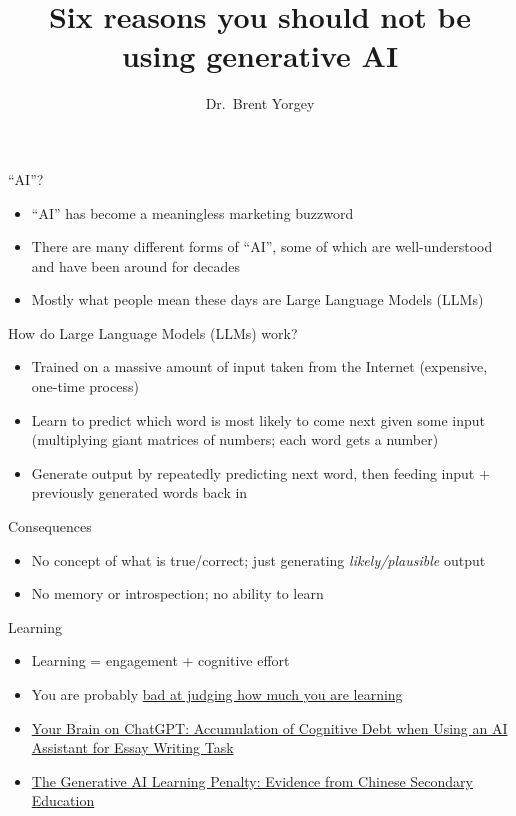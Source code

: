 \documentclass[hyperref={colorlinks},xcolor={usenames,dvipsnames,svgnames,table},12pt]{beamer}
\title{Six reasons you should not be using generative AI}
\date{}
\author{Dr.\ Brent Yorgey}
\begin{document}
\maketitle

\begin{frame}{``AI''?}
  \begin{itemize}
  \item ``AI'' has become a meaningless marketing buzzword
  \item There are many different forms of ``AI'', some of which are
    well-understood and have been around for decades
  \item Mostly what people mean these days are Large Language Models (LLMs)
  \end{itemize}
\end{frame}

\begin{frame}{How do Large Language Models (LLMs) work?}
  \begin{itemize}
  \item Trained on a massive amount of input taken from the Internet
    (expensive, one-time process)
  \item Learn to predict which word is most likely to come next given
    some input (multiplying giant matrices of numbers; each word gets
    a number)
  \item Generate output by repeatedly predicting next word, then
    feeding input + previously generated words back in
  \end{itemize}
\end{frame}

\begin{frame}{Consequences}
  \begin{itemize}
  \item No concept of what is true/correct; just generating
    \emph{likely/plausible} output
  \item No memory or introspection; no ability to learn
  \end{itemize}
\end{frame}

\begin{frame}{Learning}
  \begin{itemize}
  \item Learning = engagement + cognitive effort
  \item You are probably \href{https://www.pnas.org/doi/10.1073/pnas.1821936116}{bad at judging how much you are learning}
  \item \href{https://arxiv.org/abs/2506.08872}{Your Brain on ChatGPT:
      Accumulation of Cognitive Debt when Using an AI Assistant for
      Essay Writing Task}
  \item \href{https://papers.ssrn.com/sol3/papers.cfm?abstract_id=6868618}{The Generative AI Learning Penalty: Evidence from Chinese Secondary Education}
  \end{itemize}
\end{frame}
\end{document}
